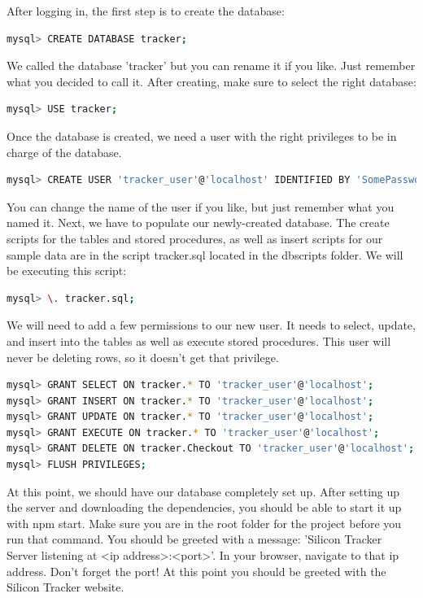 \documentclass[10pt, onecolumn, twoside, peerreview]{IEEEtran}
\begin{document}
After logging in, the first step is to create the database:

\begin{lstlisting}[language=bash]
mysql> CREATE DATABASE tracker;
\end{lstlisting}

We called the database 'tracker' but you can rename it if you like. Just remember what you decided to call it. After creating, make sure to select the right database:
\begin{lstlisting}[language=bash]
mysql> USE tracker;
\end{lstlisting}

Once the database is created, we need a user with the right privileges to be in charge of the database.
\begin{lstlisting}[language=bash]
mysql> CREATE USER 'tracker_user'@'localhost' IDENTIFIED BY 'SomePassword';
\end{lstlisting}

You can change the name of the user if you like, but just remember what you named it.
Next, we have to populate our newly-created database. The create scripts for the tables and stored procedures, as well as insert scripts for our sample data are in the script tracker.sql located in the dbscripts folder. We will be executing this script:
\begin{lstlisting}[language=bash]
mysql> \. tracker.sql;
\end{lstlisting}

We will need to add a few permissions to our new user. It needs to select, update, and insert into the tables as well as execute stored procedures. This user will never be deleting rows, so it doesn't get that privilege.

\begin{lstlisting}[language=bash]
mysql> GRANT SELECT ON tracker.* TO 'tracker_user'@'localhost';
mysql> GRANT INSERT ON tracker.* TO 'tracker_user'@'localhost';
mysql> GRANT UPDATE ON tracker.* TO 'tracker_user'@'localhost';
mysql> GRANT EXECUTE ON tracker.* TO 'tracker_user'@'localhost';
mysql> GRANT DELETE ON tracker.Checkout TO 'tracker_user'@'localhost';
mysql> FLUSH PRIVILEGES;
\end{lstlisting}

At this point, we should have our database completely set up.
After setting up the server and downloading the dependencies, you should be able to start it up with npm start. Make sure you are in the root folder for the project before you run that command. You should be greeted with a message: 'Silicon Tracker Server listening at <ip address>:<port>'. In your browser, navigate to that ip address. Don't forget the port! At this point you should be greeted with the Silicon Tracker website.
\end{document}

